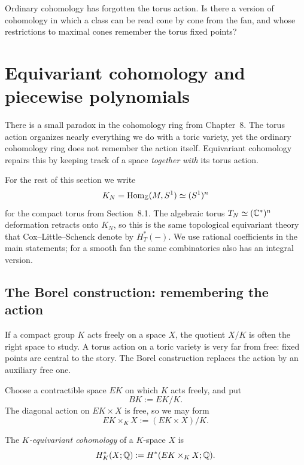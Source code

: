 \begin{guidingquestion}
Ordinary cohomology has forgotten the torus action. Is there a version
of cohomology in which a class can be read cone by cone from the fan,
and whose restrictions to maximal cones remember the torus fixed
points?
\end{guidingquestion}

\section{Equivariant cohomology and piecewise polynomials}
\label{sec:equivariant-piecewise-polynomials}

There is a small paradox in the cohomology ring from Chapter~8. The
torus action organizes nearly everything we do with a toric variety,
yet the ordinary cohomology ring does not remember the action itself.
Equivariant cohomology repairs this by keeping track of a space
\emph{together with} its torus action.

For the rest of this section we write
\[
K_N=\operatorname{Hom}_{\mathbb{Z}}(M,S^1)\simeq(S^1)^n
\]
for the compact torus from Section~8.1. The algebraic torus
\(T_N\simeq(\mathbb{C}^*)^n\) deformation retracts onto \(K_N\), so this is the
same topological equivariant theory that Cox--Little--Schenck denote by
\(H_T^*(-)\). We use rational coefficients in the main statements;
for a smooth fan the same combinatorics also has an integral version.

\subsection{The Borel construction: remembering the action}

If a compact group \(K\) acts freely on a space \(X\), the quotient
\(X/K\) is often the right space to study. A torus action on a toric
variety is very far from free: fixed points are central to the story.
The Borel construction replaces the action by an auxiliary free one.

Choose a contractible space \(EK\) on which \(K\) acts freely, and put
\[
BK:=EK/K.
\]
The diagonal action on \(EK\times X\) is free, so we may form
\[
EK\times_KX:=(EK\times X)/K.
\]

\begin{definition}
\label{def:equivariant-cohomology}
The \emph{\(K\)-equivariant cohomology} of a \(K\)-space \(X\) is
\[
H_K^*(X;\mathbb{Q})
:=
H^*(EK\times_KX;\mathbb{Q}).
\]
\end{definition}

